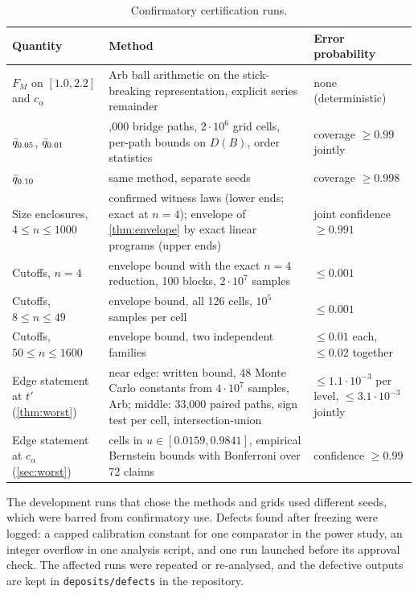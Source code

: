 \begin{table}[h]
\centering
\small
\caption{Confirmatory certification runs.}
\label{tab:runs}
\begin{tabularx}{\linewidth}{>{\raggedright\arraybackslash}p{3.3cm}>{\raggedright\arraybackslash}X>{\raggedright\arraybackslash}p{3.1cm}}
\toprule
Quantity & Method & Error probability \\
\midrule
$F_M$ on $[1.0,2.2]$ and $c_\alpha$ & Arb ball arithmetic on the stick-breaking representation, explicit series remainder & none (deterministic) \\
$\bar q_{0.05}$, $\bar q_{0.01}$ & 12,000 bridge paths, $2\cdot10^6$ grid cells, per-path bounds on $D(B)$, order statistics & coverage $\ge0.99$ jointly \\
$\bar q_{0.10}$ & same method, separate seeds & coverage $\ge0.998$ \\
Size enclosures, $4\le n\le1000$ & confirmed witness laws (lower ends; exact at $n=4$); envelope of \cref{thm:envelope} by exact linear programs (upper ends) & joint confidence $\ge0.991$ \\
Cutoffs, $n=4$ & envelope bound with the exact $n=4$ reduction, 100 blocks, $2\cdot10^7$ samples & $\le0.001$ \\
Cutoffs, $8\le n\le49$ & envelope bound, all 126 cells, $10^5$ samples per cell & $\le0.001$ \\
Cutoffs, $50\le n\le1600$ & envelope bound, two independent families & $\le0.01$ each, $\le0.02$ together \\
Edge statement at $t'$ (\cref{thm:worst}) & near edge: written bound, 48 Monte Carlo constants from $4\cdot10^7$ samples, Arb; middle: 33,000 paired paths, sign test per cell, intersection-union & $\le1.1\cdot10^{-3}$ per level, $\le3.1\cdot10^{-3}$ jointly \\
Edge statement at $c_\alpha$ (\cref{sec:worst}) & cells in $u\in[0.0159,0.9841]$, empirical Bernstein bounds \cite{MP09} with Bonferroni over 72 claims & confidence $\ge0.99$ \\
\bottomrule
\end{tabularx}
\end{table}

The development runs that chose the methods and grids used different seeds, which were barred from confirmatory use. Defects found after freezing were logged: a capped calibration constant for one comparator in the power study, an integer overflow in one analysis script, and one run launched before its approval check. The affected runs were repeated or re-analysed, and the defective outputs are kept in \texttt{deposits/defects} in the repository.
